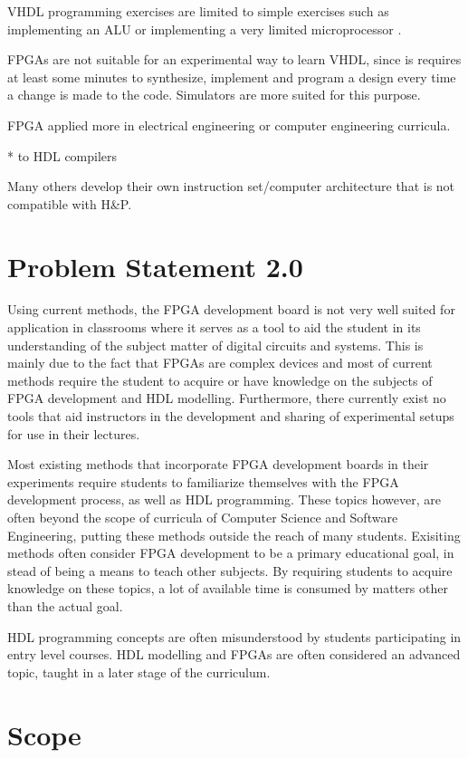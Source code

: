 \documentclass[openright]{template/uva-bachelor-thesis}
\begin{document}
VHDL programming exercises are limited to simple exercises such as implementing an ALU \cite{el2011teaching} or implementing a very limited microprocessor \cite{nativeFPGA}. 

FPGAs are not suitable for an experimental way to learn VHDL, since is requires at least some minutes to synthesize, implement and program a design every time a change is made to the code. Simulators are more suited for this purpose. 

FPGA applied more in electrical engineering or computer engineering curricula.

* to HDL compilers

Many others develop their own instruction set/computer architecture that is not compatible with H\&P.




\section{Problem Statement 2.0}
Using current methods, the FPGA development board is not very well suited for application in classrooms where it serves as a tool to aid the student in its understanding of the subject matter of digital circuits and systems. This is mainly due to the fact that FPGAs are complex devices and most of current methods require the student to acquire or have knowledge on the subjects of FPGA development and HDL modelling. Furthermore, there currently exist no tools that aid instructors in the development and sharing of experimental setups for use in their lectures. 

Most existing methods that incorporate FPGA development boards in their experiments require students to familiarize themselves with the FPGA development process, as well as HDL programming. These topics however, are often beyond the scope of curricula of Computer Science and Software Engineering, putting these methods outside the reach of many students. Exisiting methods often consider FPGA development to be a primary educational goal, in stead of being a means to teach other subjects. By requiring students to acquire knowledge on these topics, a lot of available time is consumed by matters other than the actual goal. 

HDL programming concepts are often misunderstood by students participating in entry level courses. HDL modelling and FPGAs are often considered an advanced topic, taught in a later stage of the curriculum. 


\section{Scope}
\end{document}
